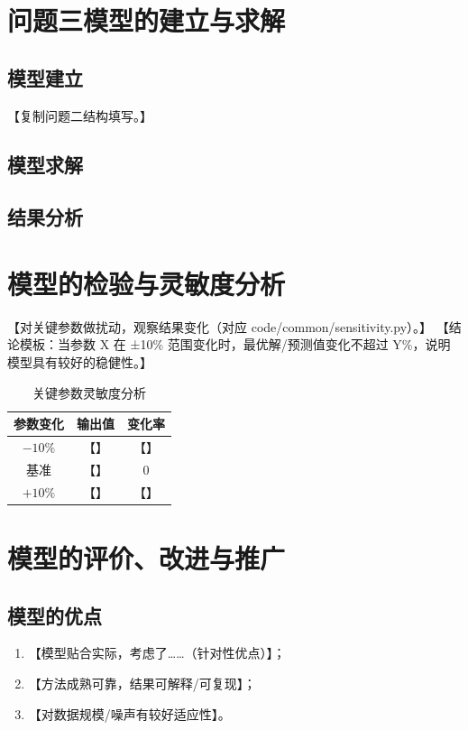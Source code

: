 \documentclass{cumcmthesis}
\begin{document}
\section{问题三模型的建立与求解}
\subsection{模型建立}
【复制问题二结构填写。】
\subsection{模型求解}
\subsection{结果分析}

\section{模型的检验与灵敏度分析}
【对关键参数做扰动，观察结果变化（对应 code/common/sensitivity.py）。】
【结论模板：当参数 X 在 ±10\% 范围变化时，最优解/预测值变化不超过 Y\%，说明模型具有较好的稳健性。】
\begin{table}[!htbp]
    \caption{关键参数灵敏度分析}\label{tab:sens}\centering
    \begin{tabular}{ccc}
        \toprule[1.5pt]
        参数变化 & 输出值 & 变化率 \\
        \midrule[1pt]
        $-10\%$ & 【】 & 【】 \\
        基准     & 【】 & $0$ \\
        $+10\%$ & 【】 & 【】 \\
        \bottomrule[1.5pt]
    \end{tabular}
\end{table}

\section{模型的评价、改进与推广}
\subsection{模型的优点}
\begin{enumerate}
    \item 【模型贴合实际，考虑了……（针对性优点）】；
    \item 【方法成熟可靠，结果可解释/可复现】；
    \item 【对数据规模/噪声有较好适应性】。
\end{enumerate}
\end{document}
